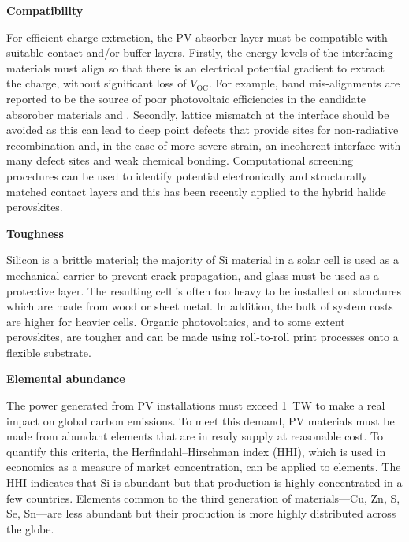 \textbf{Compatibility}

For efficient charge extraction, the PV absorber layer must be compatible with suitable contact and/or buffer layers. Firstly, the energy levels of the interfacing materials must align so that there is an electrical potential gradient to extract the charge, without significant loss of $V_\textrm{OC}$. For example, band mis-alignments are reported to be the source of poor photovoltaic efficiencies in the candidate absorober materials  and .\autocite{Ganose2016} Secondly, lattice mismatch at the interface should be avoided as this can lead to deep point defects that provide sites for non-radiative recombination and, in the case of more severe strain, an incoherent interface with many defect sites and weak chemical bonding. Computational screening procedures can be used to identify potential electronically and structurally matched contact layers and this has been recently applied to the hybrid halide perovskites.\autocite{Butler2016}


\textbf{Toughness}

Silicon is a brittle material; the majority of Si material in a solar cell is used as a mechanical carrier to prevent crack propagation, and glass must be used as a protective layer. The resulting cell is often too heavy to be installed on structures which are made from wood or sheet metal. In addition, the bulk of system costs are higher for heavier cells. Organic photovoltaics, and to some extent perovskites, are tougher and can be made using roll-to-roll print processes onto a flexible substrate.


\textbf{Elemental abundance}

The power generated from PV installations must exceed \SI{1}{TW} to make a real impact on global carbon emissions.\autocite{Battersby2019} To meet this demand, PV materials must be made from abundant elements that are in ready supply at reasonable cost. To quantify this criteria, the Herfindahl–Hirschman index (HHI), which is used in economics as a measure of market concentration, can be applied to elements. The HHI indicates that Si is abundant but that production is highly concentrated in a few countries. Elements common to the third generation of materials---Cu, Zn, S, Se, Sn---are less abundant but their production is more highly distributed across the globe.\autocite{Gaultois2013}


